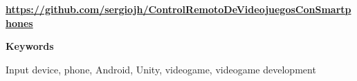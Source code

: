 \scriptsize

\textbf{\url{https://github.com/sergiojh/ControlRemotoDeVideojuegosConSmartphones}}

\normalsize

\addvspace{1cm}

\huge{\textbf{Keywords}}
\normalsize

\addvspace{1cm}

Input device, phone, Android, Unity, videogame, videogame development




\endinput

